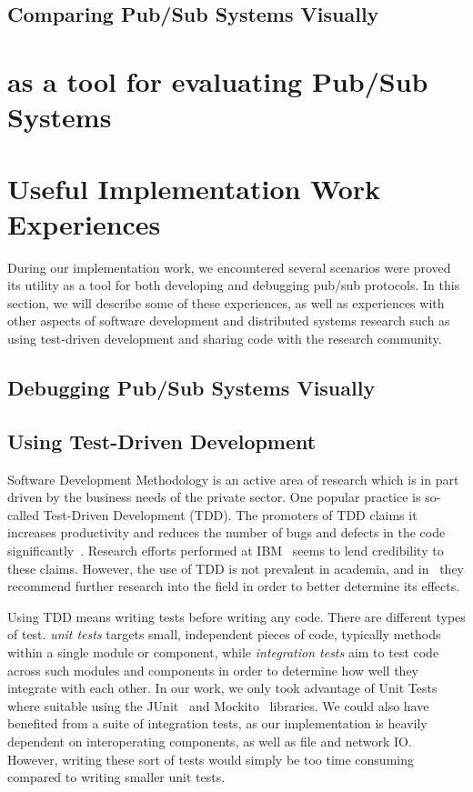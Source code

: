 \subsection{Comparing Pub/Sub Systems Visually}

\section{\demo as a tool for evaluating Pub/Sub Systems}

\section{Useful Implementation Work Experiences}

During our implementation work, we encountered several scenarios were
\demo proved its utility as a tool for both developing and debugging
pub/sub protocols. In this section, we will describe some of these
experiences, as well as experiences with other aspects of software
development and distributed systems research such as using test-driven
development and sharing code with the research community.

\subsection{Debugging Pub/Sub Systems Visually}

\subsection{Using Test-Driven Development}

Software Development Methodology is an active area of research
which is in part driven by the business needs of the private
sector\cite{janzen2005test}. One popular practice is so-called Test-Driven
Development (TDD). The promoters of TDD claims it increases
productivity and reduces the number of bugs and defects in the
code significantly~\cite{beck2003test}. Research
efforts performed at IBM~\cite{maximilien2003assessing} seems to
lend credibility to these claims. However, the use of TDD is not
prevalent in academia, and in~\cite{janzen2005test} they
recommend further research into the field in order to better
determine its effects.

Using TDD means writing tests before writing any code. There are
different types of test. \emph{unit tests} targets small,
independent pieces of code, typically methods within a single
module or component, while \emph{integration tests} aim to test
code across such modules and components in order to determine
how well they integrate with each other. In our work, we only
took advantage of Unit Tests where suitable using the
JUnit~\cite{junit} and Mockito~\cite{mockito} libraries.
We could also have benefited from a suite of integration tests,
as our implementation is heavily dependent on interoperating
components, as well as file and network IO\@. However, writing
these sort of tests would simply be too time consuming compared
to writing smaller unit tests.

